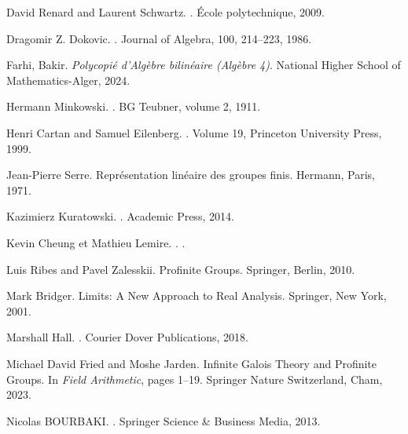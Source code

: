 \documentclass[a4paper, 14pt]{report}
\begin{document}
\begin{onehalfspace}
{\begin{thebibliography}{99}
				David Renard and Laurent Schwartz.  
				.  
				\newblock École polytechnique, 2009.
				
				
				Dragomir Z. Dokovic.
				.
				\newblock Journal of Algebra, 100, 214--223, 1986.
				
				Farhi, Bakir.
				\newblock \textit{Polycopié d'Algèbre bilinéaire (Algèbre 4)}.
				\newblock National Higher School of Mathematics-Alger, 2024.
				
				
				Hermann Minkowski.
				.
				\newblock BG Teubner, volume 2, 1911.
				
				Henri Cartan and Samuel Eilenberg.
				.
				\newblock Volume 19, Princeton University Press, 1999.
				
				Jean-Pierre Serre.
				\newblock Repr{\'e}sentation lin{\'e}aire des groupes finis.
				\newblock Hermann, Paris, 1971.
				
				Kazimierz Kuratowski.  
				.  
				\newblock Academic Press, 2014.
				
				Kevin  Cheung et Mathieu Lemire.
				.
				.
				
				
				Luis Ribes and Pavel Zalesskii.
				\newblock Profinite Groups.
				\newblock Springer, Berlin, 2010.
				
				
				Mark  Bridger.
				\newblock Limits: A New Approach to Real Analysis.
				\newblock Springer, New York, 2001.
				
				Marshall Hall.
				.
				\newblock Courier Dover Publications, 2018.
				
				
				Michael David Fried and Moshe Jarden.
				\newblock Infinite Galois Theory and Profinite Groups.
				\newblock In {\em Field Arithmetic}, pages 1--19. Springer Nature Switzerland, Cham, 2023.
				
				Nicolas BOURBAKI. 
				.
				\newblock Springer Science \& Business Media, 2013.
				

\end{thebibliography}}
\end{onehalfspace}
\end{document}
